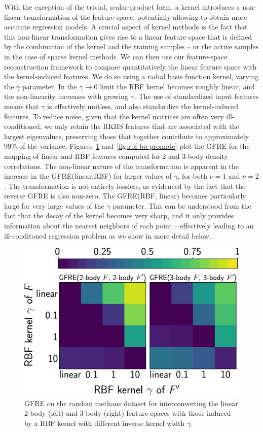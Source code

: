With the exception of the trivial, scalar-product form, a kernel introduces a non-linear transformation of the feature space, potentially allowing to obtain more accurate regression models. 
A crucial aspect of kernel methods is the fact that this non-linear transformation gives rise to a linear feature space that is defined by the combination of the kernel and the training samples -- or the active samples in the case of sparse kernel methods.
We can then use our feature-space reconstruction framework to compare quantitatively the linear feature space with the kernel-induced features. We do so using a radial basis function kernel, varying the $\gamma$ parameter. In the $\gamma\rightarrow 0$ limit the RBF kernel becomes roughly linear, and the non-linearity increases with growing $\gamma$. The use of standardized input features means that $\gamma$ is effectively unitless, and also standardize the kernel-induced features. 
To reduce noise, given that the kernel matrices are often very ill-conditioned, we only retain the RKHS features that are associated with the largest eigenvalues, preserving those that together contribute to approximately 99\%{} of the variance.
Figures~\ref{fig:rbf-density} and~\ref{fig:rbf-bo-promote} plot the GFRE for the mapping of linear and RBF features computed for 2 and 3-body density correlations. The non-linear nature of the transformation is apparent in the increase in the GFRE(linear,RBF) for larger values of $\gamma$, for both $\nu=1$ and $\nu=2$. The transformation is not entirely lossless, as evidenced by the fact that the reverse GFRE is also non-zero. The GFRE(RBF, linear) becomes particularly large for very large values of the $\gamma$ parameter. This can be understood from the fact that the decay of the kernel becomes very sharp, and it only provides information about the nearest neighbors of each point -- effectively leading to an ill-conditoned regression problem as we show in more detail below. 

\begin{figure}
    \centering
    \includegraphics[width=0.7\linewidth]{fig/rof/body_order_comparison-gfrm-rs_ps-methane-inkscaped-v3-fixed_rkhs_features.pdf}
    \caption{GFRE on the random methane dataset for interconverting the linear 2-body (left) and 3-body (right) feature spaces with those induced by a RBF kernel with different inverse  kernel width $\gamma$.}
    \label{fig:rbf-density}
\end{figure}

